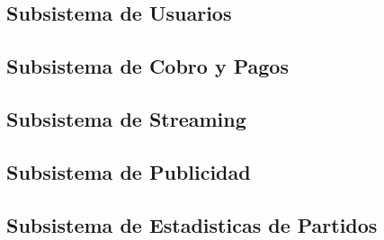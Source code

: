 \subsection{Subsistema de Usuarios}

\newpage

\subsection{Subsistema de Cobro y Pagos}

\newpage

\subsection{Subsistema de Streaming}

\newpage

\subsection{Subsistema de Publicidad}

\newpage

\subsection{Subsistema de Estadisticas de Partidos}

\newpage
